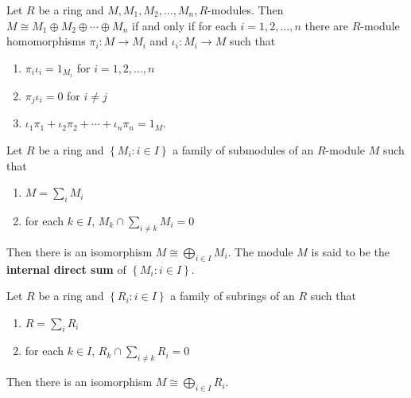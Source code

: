 \begin{theorem}
    Let $R$ be a ring and $  M,   M_1,   M_2, \ldots,   M_{  {n}},  {R}$-modules. Then $  M \cong   M_1 \oplus M_2 \oplus \cdots \oplus   M_n$
    if and only if
    for each $  i=1,2, \ldots,   {n}$ there are $R$-module homomorphisms $\pi_i:   M \rightarrow   M_i$ and $\iota_i:   M_i \rightarrow   M$ such that
    \begin{enumerate}[label=(\roman*)]
        \item $\pi_i \iota_i=1_{M_i}$
              for $i=1,2, \ldots, n$
        \item $\pi_j \iota_i=0$ for $ i \neq j$
        \item $\iota_1 \pi_1+\iota_2 \pi_2+\cdots+\iota_{  {n}} \pi_{  {n}}=1_{  M}$.
    \end{enumerate}
\end{theorem}


\begin{theorem}
    Let $R$ be a ring and $\left\{  M_i : i \in   I\right\}$ a family of submodules of an $R$-module $M$ such that
    \begin{enumerate}[label=(\roman*)]
        \item
              $M=\sum_i M_i$

        \item
              for each $ k \in I$, $M_k\cap \sum_{i\neq k} M_i
                  =
                  0$
    \end{enumerate}
    Then there is an isomorphism $  M \cong \bigoplus_{i \in I}  M_i$.
    The module $M$ is said to be the \textbf{internal direct sum} of $\left\{M_i : i \in I\right\}$.
\end{theorem}
\begin{corollary}
    Let $R$ be a ring and $\left\{  R_i : i \in  I\right\}$ a family of subrings of an $R$ such that
    \begin{enumerate}[label=(\roman*)]
        \item
              $R=\sum_i R_i$

        \item
              for each $ k \in I$, $R_k\cap \sum_{i\neq k} R_i
                  =
                  0$
    \end{enumerate}
    Then there is an isomorphism $  M \cong \bigoplus_{i \in I}  R_i$.
\end{corollary}


